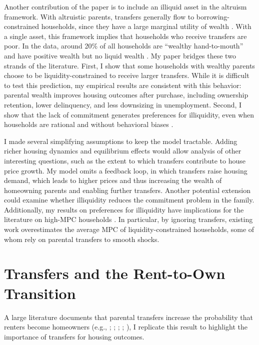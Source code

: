 \documentclass[12pt]{article}
\begin{document}
Another contribution of the paper is to include an illiquid asset in the altruism framework. With altruistic parents, transfers generally flow to borrowing-constrained households, since they have a large marginal utility of wealth \citep{Barczyk2020,Chu2020}. With a single asset, this framework implies that households who receive transfers are poor. In the data, around 20\% of all households are ``wealthy hand-to-mouth'' and have positive wealth but no liquid wealth \citep{Kaplan2014a,Attanasio2018}. My paper bridges these two strands of the literature. First, I show that some households with wealthy parents choose to be liquidity-constrained to receive larger transfers. While it is difficult to test this prediction, my empirical results are consistent with this behavior: parental wealth improves housing outcomes after purchase, including ownership retention, lower delinquency, and less downsizing in unemployment. Second, I show that the lack of commitment generates preferences for illiquidity, even when households are rational and without behavioral biases \citep[see e.g.,][]{attanasio2024temptation}. 

I made several simplifying assumptions to keep the model tractable. Adding richer housing dynamics and equilibrium effects would allow analysis of other interesting questions, such as the extent to which transfers contribute to house price growth. My model omits a feedback loop, in which transfers raise housing demand, which leads to higher prices and thus increasing the wealth of homeowning parents and enabling further transfers. Another potential extension could examine whether illiquidity reduces the commitment problem in the family. Additionally, my results on preferences for illiquidity have implications for the literature on high-MPC households \citep[see e.g.,][]{kaplan2022marginal}. In particular, by ignoring transfers, existing work overestimates the average MPC of liquidity-constrained households, some of whom rely on parental transfers to smooth shocks. 

\newpage
\begingroup\singlespacing


\endgroup
\newpage


\appendix

\setcounter{figure}{0}
\renewcommand{\thefigure}{A\arabic{figure}}
\setcounter{table}{0}
\renewcommand{\thetable}{A\arabic{table}}

\section{Transfers and the Rent-to-Own Transition}\label{app:rent_to_own}
A large literature documents that parental transfers increase the probability that renters become homeowners (e.g., \citealp{wold2024housing}; \citealp{Blickle2019}; \citealp{benetton2022dynastic}; \citealp{Guiso2002}; \citealp{Engelhardt1998}), I replicate this result to highlight the importance of transfers for housing outcomes. 
\end{document}
